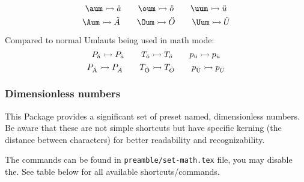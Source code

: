         \[
            \verb|\aum| \rightarrowtail  \aum \qquad
            \verb|\oum| \rightarrowtail  \oum \qquad
            \verb|\uum| \rightarrowtail  \uum
        \]
        \[
            \verb|\Aum| \rightarrowtail  \Aum \qquad
            \verb|\Oum| \rightarrowtail  \Oum \qquad
            \verb|\Uum| \rightarrowtail  \Uum
        \]

        Compared to normal Umlauts being used in math mode:
        \[
            P_{\ddot{\mathrm{a}}} \rightarrowtail P_{\ddot{a}} \qquad
            T_{\ddot{\mathrm{o}}} \rightarrowtail T_{\ddot{o}} \qquad
            p_{\ddot{\mathrm{u}}} \rightarrowtail p_{\ddot{u}}
        \]
        \[
            P_{\ddot{\mathrm{A}}} \rightarrowtail P_{\ddot{A}} \qquad
            T_{\ddot{\mathrm{O}}} \rightarrowtail T_{\ddot{O}} \qquad
            p_{\ddot{\mathrm{U}}} \rightarrowtail p_{\ddot{U}}
        \]


    \subsubsection{Dimensionless numbers}
        This Package provides a significant set of preset named, dimensionless numbers. Be aware that these are not simple shortcuts but have specific kerning (the distance between characters) for better readability and recognizability.

        The commands can be found in \texttt{preamble/set-math.tex} file, you may disable the. See table below for all available shortcuts/commands.

